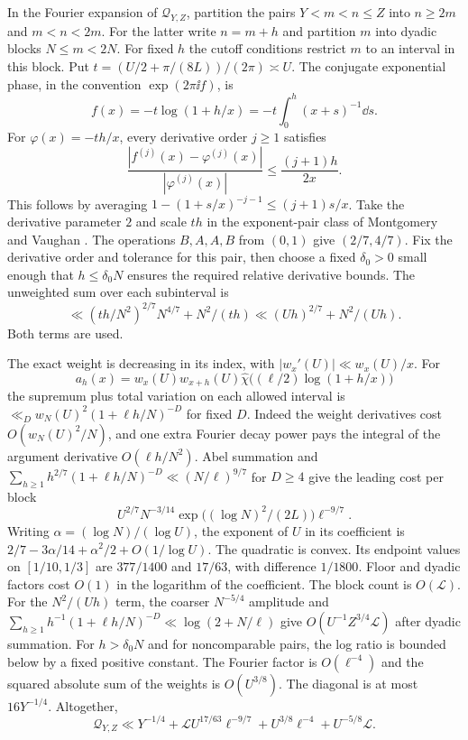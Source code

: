 In the Fourier expansion of \(\mathcal Q_{Y,Z}\), partition the
pairs \(Y<m<n\le Z\) into \(n\ge2m\) and \(m<n<2m\).
For the latter write \(n=m+h\) and partition \(m\) into
dyadic blocks \(N\le m<2N\). For fixed \(h\) the cutoff
conditions restrict \(m\) to an interval in this block. Put
\(t=(U/2+\pi/(8L))/(2\pi)\asymp U\). The conjugate exponential
phase, in the convention \(\exp(2\pi\ii f)\), is
\[
 f(x)=-t\log(1+h/x)=-t\int_0^h(x+s)^{-1}\dd s .
\]
For \(\varphi(x)=-th/x\), every derivative order \(j\ge1\) satisfies
\[
 \frac{|f^{(j)}(x)-\varphi^{(j)}(x)|}{|\varphi^{(j)}(x)|}
 \le \frac{(j+1)h}{2x}.
\]
This follows by averaging
\(1-(1+s/x)^{-j-1}\le(j+1)s/x\). Take the derivative
parameter \(2\) and scale \(th\) in the exponent-pair class
of Montgomery and Vaughan \cite[Definitions 16.1--16.2 and
Theorems 16.23, 16.25]{MontgomeryVaughanExponentialSums2026}.
The operations \(B,A,A,B\) from \((0,1)\) give \((2/7,4/7)\).
Fix the derivative order and tolerance for this pair, then
choose a fixed \(\delta_0>0\) small enough that \(h\le\delta_0N\)
ensures the required relative derivative bounds. The unweighted
sum over each subinterval is
\[
 \ll (th/N^2)^{2/7}N^{4/7}+N^2/(th)
 \ll (Uh)^{2/7}+N^2/(Uh).
\]
Both terms are used.

The exact weight is decreasing in its index, with
\(|w_x'(U)|\ll w_x(U)/x\). For
\[
 a_h(x)=w_x(U)w_{x+h}(U)
          \widehat\chi\bigl((\ell/2)\log(1+h/x)\bigr)
\]
the supremum plus total variation on each allowed interval is
\(\ll_D w_N(U)^2(1+\ell h/N)^{-D}\) for fixed \(D\).
Indeed the weight derivatives cost \(O(w_N(U)^2/N)\),
and one extra Fourier decay power pays the integral of the
argument derivative \(O(\ell h/N^2)\).
Abel summation and
\(\sum_{h\ge1}h^{2/7}(1+\ell h/N)^{-D}\ll (N/\ell)^{9/7}\)
for \(D\ge4\) give the leading cost per block
\[
 U^{2/7}N^{-3/14}\exp\bigl((\log N)^2/(2L)\bigr)\ell^{-9/7}.
\]
Writing \(\alpha=(\log N)/(\log U)\), the exponent of \(U\)
in its coefficient is \(2/7-3\alpha/14+\alpha^2/2+O(1/\log U)\).
The quadratic is convex. Its endpoint values on \([1/10,1/3]\)
are \(377/1400\) and \(17/63\), with difference \(1/1800\).
Floor and dyadic factors cost \(O(1)\) in the logarithm of the
coefficient. The block count is \(O(\mathcal L)\).
For the \(N^2/(Uh)\) term, the coarser \(N^{-5/4}\) amplitude
and \(\sum_{h\ge1} h^{-1}(1+\ell h/N)^{-D}\ll\log(2+N/\ell)\)
give \(O(U^{-1}Z^{3/4}\mathcal L)\) after dyadic summation.
For \(h>\delta_0 N\) and for noncomparable pairs, the log ratio
is bounded below by a fixed positive constant. The Fourier
factor is \(O(\ell^{-4})\) and the squared absolute sum of the
weights is \(O(U^{3/8})\). The diagonal is at most \(16Y^{-1/4}\).
Altogether,
\begin{equation}\label{eq:b10-low}
 \mathcal Q_{Y,Z}\ll Y^{-1/4}+\mathcal L U^{17/63}\ell^{-9/7}
                       +U^{3/8}\ell^{-4}+U^{-5/8}\mathcal L .
\end{equation}

